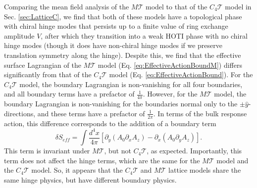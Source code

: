 \documentclass[prb,aps,twocolumn,groupaddress,floatfix]{revtex4-1}
\begin{document}
Comparing the mean field analysis of the $M\mathcal{T}$ model to that of the $C_4\mathcal{T}$ model in Sec. \ref{sec:LatticeC}, we find that both of these models have a topological phase with chiral hinge modes that persists up to a finite value of ring exchange amplitude $V$, after which they transition into a weak HOTI phase with no chiral hinge modes (though it does have non-chiral hinge modes if we preserve translation symmetry along the hinge). Despite this, we find that the effective surface Lagrangian of the $M\mathcal{T}$ model (Eq. \ref{eq:EffectiveActionBoundM}) differs significantly from that of the $C_4\mathcal{T}$ model (Eq. \ref{eq:EffectiveActionBound}). For the $C_4\mathcal{T}$ model, the boundary Lagrangian is non-vanishing for all four boundaries, and all boundary terms have a prefactor of $\frac{1}{4\pi}$. However, for the $M\mathcal{T}$ model, the boundary Lagrangian is non-vanishing for the boundaries normal only to the $\pm \hat{y}$-directions, and these terms have a prefactor of $\frac{1}{2\pi}$. In terms of the bulk response action, this difference corresponds to the addition of a boundary term
\begin{equation}
\delta S_{eff} = \int \frac{d^4x}{4\pi} [\partial_y(A_0 \partial_x A_z) -\partial_x(A_0 \partial_y A_z) ].\label{eq:AdBound}
\end{equation} 
This term is invariant under $M\mathcal{T}$, but not $C_4\mathcal{T}$, as expected. Importantly, this term does not affect the hinge terms, which are the same for the $M\mathcal{T}$ model and the $C_4\mathcal{T}$ model. So, it appears that the $C_4\mathcal{T}$ and $M\mathcal{T}$ lattice models share the same hinge physics, but have different boundary physics. 
\end{document}
